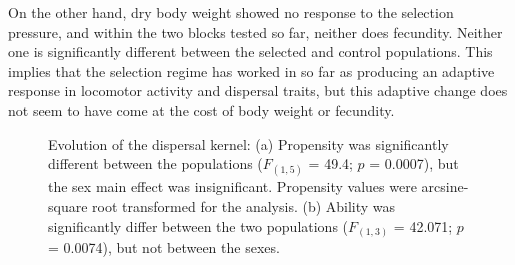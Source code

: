 \documentclass[12pt,onecolumn,twoside]{article}
\begin{document}
	On the other hand, dry body weight showed no response to the selection pressure, and within the two blocks tested so far, neither does fecundity. Neither one is significantly different between the selected and control populations. This implies that the selection regime has worked in so far as producing an adaptive response in locomotor activity and dispersal traits, but this adaptive change does not seem to have come at the cost of body weight or fecundity.
	\begin{figure}
		\centering
		\begin{subfigure}{0.7\textwidth}
			\scalebox{0.5}{}
			\subcaption{\empty}
		\end{subfigure}
		\begin{subfigure}{0.7\textwidth}
			\scalebox{0.5}{}
			\subcaption{\empty}
		\end{subfigure}
		\caption{\label{fig1} Evolution of the dispersal kernel: (a) Propensity was significantly different between the populations ($F_{(1, 5)}$ = 49.4; $p$ = 0.0007), but the sex main effect was insignificant. Propensity values were arcsine-square root transformed for the analysis. (b) Ability was significantly differ between the two populations ($F_{(1, 3)}$ = 42.071; $p$ = 0.0074), but not between the sexes.}
	\end{figure}
\end{document}
